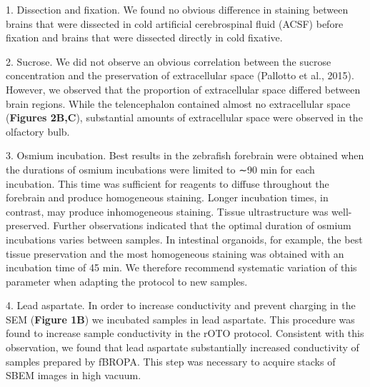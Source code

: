 \documentclass{article}
\newenvironment{steplist}{\par\setlength{\parindent}{0pt}\everypar{\hangindent=1.6em\hangafter=1\relax}}{\par\smallskip}
\begin{document}
\begin{steplist}
1. Dissection and fixation. We found no obvious difference in staining between brains that were dissected in cold artificial cerebrospinal fluid (ACSF) before fixation and brains that were dissected directly in cold fixative.

2. Sucrose. We did not observe an obvious correlation between the sucrose concentration and the preservation of extracellular space (Pallotto et al., 2015). However, we observed that the proportion of extracellular space differed between brain regions. While the telencephalon contained almost no extracellular space (\textbf{Figures 2B,C}), substantial amounts of extracellular space were observed in the olfactory bulb.

3. Osmium incubation. Best results in the zebrafish forebrain were obtained when the durations of osmium incubations were limited to ∼90 min for each incubation. This time was sufficient for reagents to diffuse throughout the forebrain and produce homogeneous staining. Longer incubation times, in contrast, may produce inhomogeneous staining. Tissue ultrastructure was well-preserved. Further observations indicated that the optimal duration of osmium incubations varies between samples. In intestinal organoids, for example, the best tissue preservation and the most homogeneous staining was obtained with an incubation time of 45 min. We therefore recommend systematic variation of this parameter when adapting the protocol to new samples.

4. Lead aspartate. In order to increase conductivity and prevent charging in the SEM (\textbf{Figure 1B}) we incubated samples in lead aspartate. This procedure was found to increase sample conductivity in the rOTO protocol. Consistent with this observation, we found that lead aspartate substantially increased conductivity of samples prepared by fBROPA. This step was necessary to acquire stacks of SBEM images in high vacuum.
\end{steplist}
\end{document}
